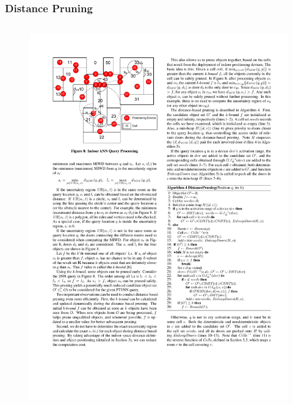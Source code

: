\begin{frame}
\frametitle{Distance Pruning}

\begin{columns}[c]

    \begin{figure}[tb]
      \includegraphics[width=\columnwidth]{figures/2-3/2-3-9.pdf}
    \end{figure}


\end{columns}
\end{frame}

